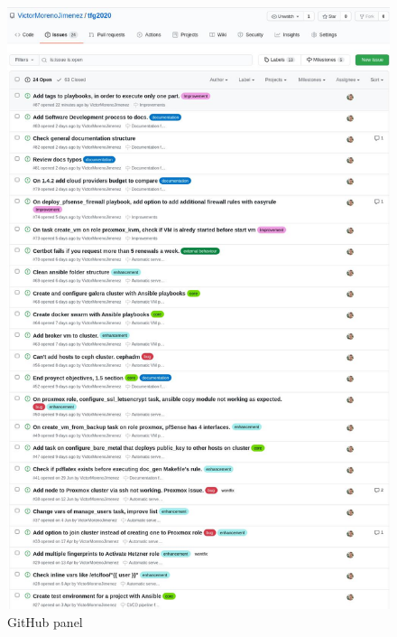 \begin{paragraph}
			\begin{figure}[!hbt]
				\centering
				\includegraphics[scale=0.44]{imagenes/Analisis/githubissues.jpg}
				\caption[GitHub panel]{GitHub panel}
				\label{github_issues}
			\end{figure}
	\end{paragraph}
	\clearpage


	
	
	
